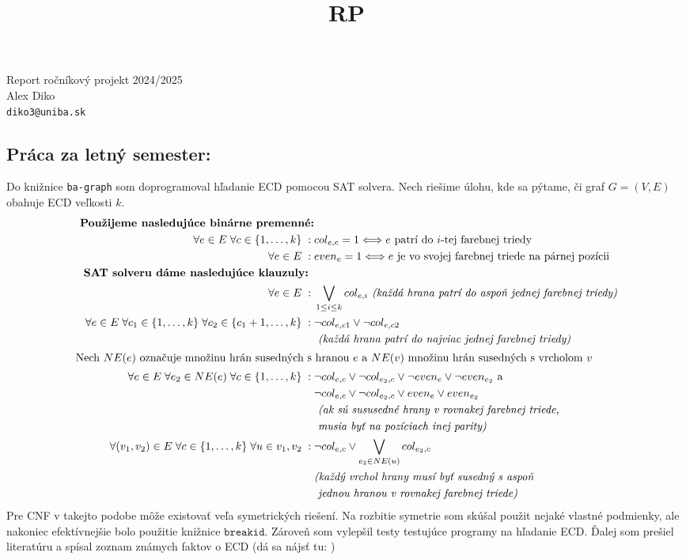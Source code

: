 \documentclass[11pt]{article}
\begin{document}
\title{RP}
\begin{center}
    {\LARGE Report ročníkový projekt 2024/2025}\\[1em]
    {\large Alex Diko  \\ \texttt{diko3@uniba.sk}}\\[1em]
\end{center}
\subsection*{Práca za letný semester:}
Do knižnice \texttt{ba-graph} som doprogramoval hľadanie ECD
pomocou SAT solvera. Nech riešime úlohu, kde sa pýtame, či graf $G = (V,E)$ obahuje
ECD veľkosti $k$.
\begin{align*}
\textbf{ Použijeme nasledujúce binárne premenné:}&\\
\forall e \in E \; \forall c \in \{1,\ldots,k\}\; : \; &col_{e,c} = 1 \Longleftrightarrow
\text{$e$ patrí do $i$-tej farebnej triedy}\\
\forall e\in E \;: \;&even_{e} = 1\Longleftrightarrow \text{$e$ je vo svojej 
farebnej triede na párnej pozícii}\\
\textbf{SAT solveru dáme nasledujúce klauzuly: }&\\
\forall e \in E \; : \; &\bigvee_{1\leq i \leq k} col_{e,i}  \textit{ (každá
hrana patrí do aspoň jednej farebnej triedy)}\\
\forall e \in E \; \forall c_1 \in \{1,\ldots, k\} \; \forall c_2 \in \{c_1+1,\ldots,k\}\; : \; &
\lnot col_{e,c1} \lor \lnot col_{e,c2} \\&\textit{ (každá hrana patrí do najviac
jednej farebnej triedy)}\\
\shortintertext{Nech $NE(e)$ označuje množinu hrán susedných s hranou $e$ a $NE(v)$ množinu
hrán susedných s vrcholom $v$}
\forall e \in E \; \forall e_2 \in NE(e)\; \forall c \in \{1,\ldots,k\} 
\;: \; &\lnot col_{e,c} \lor \lnot col_{e_2,c}
\lor \lnot even_{e} \lor \lnot even_{e_2} \text{ a }\\
&\lnot col_{e,c} \lor \lnot col_{e_2,c} \lor even_{e} \lor even_{e_2} \\&\textit{ (ak sú sususedné hrany
v rovnakej farebnej triede, } \\&\textit{ musia byť na pozíciach inej parity)}\\
\forall (v_1,v_2) \in E \; \forall c \in \{1, \ldots, k\} \; \forall 
u \in {v_1,v_2} \;: \; &\lnot col_{e,c} \lor \bigvee_{e_2 \in NE(u)} 
col_{e_2, c}\\
&\textit{(každý vrchol hrany musí byť susedný s aspoň}\\
&\textit{ jednou hranou v rovnakej farebnej triede)}
\end{align*}
Pre CNF v takejto podobe môže existovať veľa symetrických
riešení. Na rozbitie symetrie som skúšal použit nejaké vlastné podmienky,
ale nakoniec efektívnejšie bolo použitie knižnice $\texttt{breakid}$.
Zároveň som vylepšil testy testujúce programy na hľadanie ECD. Ďalej
som prešiel literatúru a spísal zoznam známych faktov o ECD (dá sa nájsť
tu: )
\end{document}
